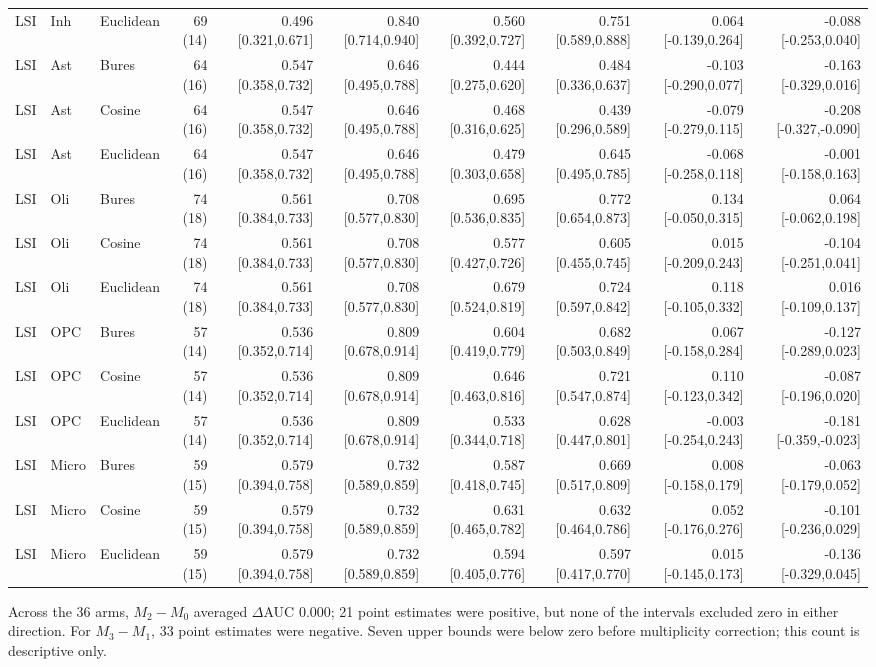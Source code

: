 \documentclass[9pt]{article}
\begin{document}
\begin{landscape}
\begin{longtable}{lllrrrrrrr}
LSI & Inh & Euclidean & 69 (14) & 0.496 [0.321,0.671] & 0.840 [0.714,0.940] & 0.560 [0.392,0.727] & 0.751 [0.589,0.888] & 0.064 [-0.139,0.264] & -0.088 [-0.253,0.040] \\
LSI & Ast & Bures & 64 (16) & 0.547 [0.358,0.732] & 0.646 [0.495,0.788] & 0.444 [0.275,0.620] & 0.484 [0.336,0.637] & -0.103 [-0.290,0.077] & -0.163 [-0.329,0.016] \\
LSI & Ast & Cosine & 64 (16) & 0.547 [0.358,0.732] & 0.646 [0.495,0.788] & 0.468 [0.316,0.625] & 0.439 [0.296,0.589] & -0.079 [-0.279,0.115] & -0.208 [-0.327,-0.090] \\
LSI & Ast & Euclidean & 64 (16) & 0.547 [0.358,0.732] & 0.646 [0.495,0.788] & 0.479 [0.303,0.658] & 0.645 [0.495,0.785] & -0.068 [-0.258,0.118] & -0.001 [-0.158,0.163] \\
LSI & Oli & Bures & 74 (18) & 0.561 [0.384,0.733] & 0.708 [0.577,0.830] & 0.695 [0.536,0.835] & 0.772 [0.654,0.873] & 0.134 [-0.050,0.315] & 0.064 [-0.062,0.198] \\
LSI & Oli & Cosine & 74 (18) & 0.561 [0.384,0.733] & 0.708 [0.577,0.830] & 0.577 [0.427,0.726] & 0.605 [0.455,0.745] & 0.015 [-0.209,0.243] & -0.104 [-0.251,0.041] \\
LSI & Oli & Euclidean & 74 (18) & 0.561 [0.384,0.733] & 0.708 [0.577,0.830] & 0.679 [0.524,0.819] & 0.724 [0.597,0.842] & 0.118 [-0.105,0.332] & 0.016 [-0.109,0.137] \\
LSI & OPC & Bures & 57 (14) & 0.536 [0.352,0.714] & 0.809 [0.678,0.914] & 0.604 [0.419,0.779] & 0.682 [0.503,0.849] & 0.067 [-0.158,0.284] & -0.127 [-0.289,0.023] \\
LSI & OPC & Cosine & 57 (14) & 0.536 [0.352,0.714] & 0.809 [0.678,0.914] & 0.646 [0.463,0.816] & 0.721 [0.547,0.874] & 0.110 [-0.123,0.342] & -0.087 [-0.196,0.020] \\
LSI & OPC & Euclidean & 57 (14) & 0.536 [0.352,0.714] & 0.809 [0.678,0.914] & 0.533 [0.344,0.718] & 0.628 [0.447,0.801] & -0.003 [-0.254,0.243] & -0.181 [-0.359,-0.023] \\
LSI & Micro & Bures & 59 (15) & 0.579 [0.394,0.758] & 0.732 [0.589,0.859] & 0.587 [0.418,0.745] & 0.669 [0.517,0.809] & 0.008 [-0.158,0.179] & -0.063 [-0.179,0.052] \\
LSI & Micro & Cosine & 59 (15) & 0.579 [0.394,0.758] & 0.732 [0.589,0.859] & 0.631 [0.465,0.782] & 0.632 [0.464,0.786] & 0.052 [-0.176,0.276] & -0.101 [-0.236,0.029] \\
LSI & Micro & Euclidean & 59 (15) & 0.579 [0.394,0.758] & 0.732 [0.589,0.859] & 0.594 [0.405,0.776] & 0.597 [0.417,0.770] & 0.015 [-0.145,0.173] & -0.136 [-0.329,0.045] \\
\bottomrule
\end{longtable}
\footnotesize
Across the 36 arms, $M_2-M_0$ averaged $\Delta$AUC 0.000; 21 point estimates were positive, but none of the intervals excluded zero in either direction. For $M_3-M_1$, 33 point estimates were negative. Seven upper bounds were below zero before multiplicity correction; this count is descriptive only.
\end{landscape}
\end{document}

